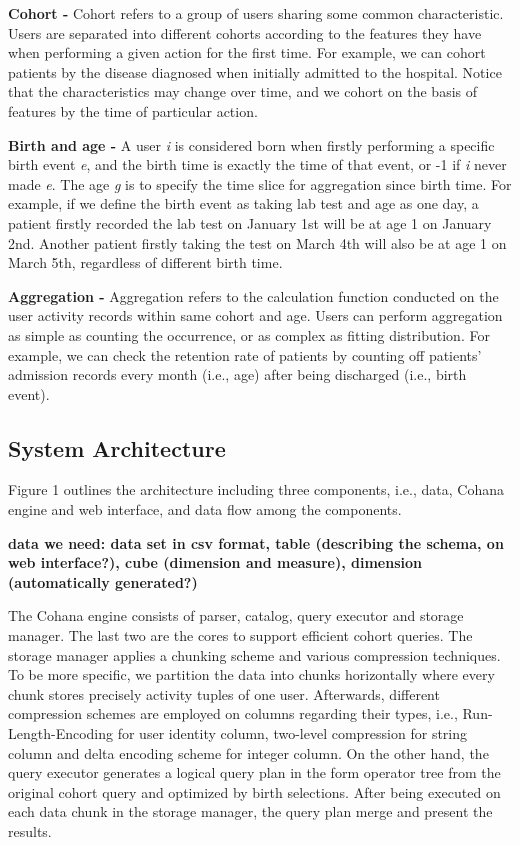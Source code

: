 \documentclass[10pt,conference,letterpaper]{IEEEtran}
\begin{document}
\textbf{Cohort -} Cohort refers to a group of users sharing some common characteristic. Users are separated into different cohorts according to the features they have when performing a given action for the first time. For example, we can cohort patients by the disease diagnosed when initially admitted to the hospital. Notice that the characteristics may change over time, and we cohort on the basis of features by the time of particular action.

\textbf{Birth and age -} A user \emph{i} is considered born when firstly performing a specific birth event \emph{e}, and the birth time is exactly the time of that event, or -1 if \emph{i} never made \emph{e}. The age \emph{g} is to specify the time slice for aggregation since birth time. For example, if we define the birth event as taking lab test and age as one day, a patient firstly recorded the lab test on January 1st will be at age 1 on January 2nd. Another patient firstly taking the test on March 4th will also be at age 1 on March 5th, regardless of different birth time.

\textbf{Aggregation -} Aggregation refers to the calculation function conducted on the user activity records within same cohort and age. Users can perform aggregation as simple as counting the occurrence, or as complex as fitting distribution. For example, we can check the retention rate of patients by counting off patients' admission records every month (i.e., age) after being discharged (i.e., birth event).

\subsection{System Architecture}

Figure 1 outlines the architecture including three components, i.e., data, Cohana engine and web interface, and data flow among the components.

\textbf{data we need: data set in csv format, table (describing the schema, on web interface?), cube (dimension and measure), dimension (automatically generated?) }

The Cohana engine consists of parser, catalog, query executor and storage manager. The last two are the cores to support efficient cohort queries. The storage manager applies a chunking scheme and various compression techniques. To be more specific, we partition the data into chunks horizontally where every chunk stores precisely activity tuples of one user. Afterwards, different compression schemes are employed on columns regarding their types, i.e., Run-Length-Encoding for user identity column, two-level compression for string column and delta encoding scheme for integer column. On the other hand, the query executor generates a logical query plan in the form operator tree from the original cohort query and optimized by birth selections. After being executed on each data chunk in the storage manager, the query plan merge and present the results.
\end{document}
